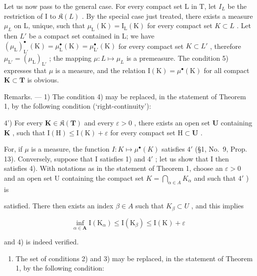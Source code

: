 Let us now pass to the general case. For every compact set L in T, let \(I_{L}\) be the restriction of I to \(\mathfrak{K}(L)\) . By the special case just treated, there exists a measure \(\mu_{L}\) on L, unique, such that \(\mu_{\mathrm{L}}(\mathrm{K}) = \mathrm{I}_{\mathrm{L}}(\mathrm{K})\) for every compact set \(K \subset L\) . Let then \(L'\) be a compact set contained in L; we have \((\mu_{\mathrm{L}})_{\mathrm{L}'}^{\bullet}(\mathrm{K}) = \mu_{\mathrm{L}}^{\bullet}(\mathrm{K}) = \mu_{\mathrm{L}'}^{\bullet}(\mathrm{K})\) for every compact set \(K \subset L'\) , therefore \(\mu_{\mathrm{L}'} = (\mu_{\mathrm{L}})_{\mathrm{L}'}\) ; the mapping \(\mu : L \mapsto \mu_{L}\) is a premeasure. The condition 5) expresses that \(\mu\) is a measure, and the relation \(\mathrm{I}(\mathrm{K}) = \mu^{\bullet}(\mathrm{K})\) for all compact \(\mathbf{K} \subset \mathbf{T}\) is obvious.

Remarks. --- 1) The condition 4) may be replaced, in the statement of Theorem 1, by the following condition (`right-continuity'):

4') For every \(\mathbf{K} \in \mathfrak{K}(\mathbf{T})\) and every \(\varepsilon > 0\) , there exists an open set \(\mathbf{U}\) containing \(\mathbf{K}\) , such that \(\mathrm{I}(\mathrm{H}) \leqslant \mathrm{I}(\mathrm{K}) + \varepsilon\) for every compact set \(\mathrm{H} \subset \mathbf{U}\) .

For, if \(\mu\) is a measure, the function \(I: K \mapsto \mu^{\bullet}(K)\) satisfies \(4'\) (§1, No.~9, Prop. 13). Conversely, suppose that I satisfies 1) and \(4'\) ; let us show that I then satisfies 4). With notations as in the statement of Theorem 1, choose an \(\varepsilon > 0\) and an open set U containing the compact set \(K = \bigcap_{\alpha \in A} K_{\alpha}\) and such that \(4'\) ) is

satisfied. There then exists an index \(\beta \in A\) such that \(K_{\beta} \subset U\) , and this implies

\[
\inf _ {\alpha \in \mathbf {A}} \mathrm{I} (\mathrm{K} _ {\alpha}) \leqslant \mathrm{I} (\mathrm{K} _ {\beta}) \leqslant \mathrm{I} (\mathrm{K}) + \varepsilon
\]

and 4) is indeed verified.

\begin{enumerate}
\def\labelenumi{\arabic{enumi})}
\setcounter{enumi}{1}
\tightlist
\item
  The set of conditions 2) and 3) may be replaced, in the statement of Theorem 1, by the following condition:
\end{enumerate}

